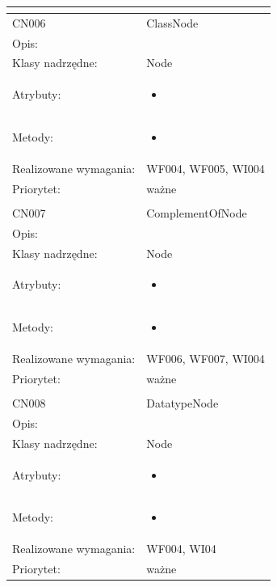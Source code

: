 \documentclass[a4paper,10pt]{article}
\begin{document}
\begin{center}
\begin{longtable}{|m{3cm}|m{9cm}|}
\multicolumn{2}{c}{} \\
 \hline

CN006 & ClassNode \\ \hline
Opis: &     \\ \hline
Klasy nadrzędne: & Node     \\ \hline
Atrybuty: & \begin{itemize}
 \item 
\end{itemize}
 \\ \hline
Metody: & \begin{itemize}
 \item 
\end{itemize}
  \\ \hline
Realizowane wymagania: & WF004, WF005, WI004 \\ \hline
Priorytet: & ważne  \\ \hline

\multicolumn{2}{c}{} \\
 \hline

CN007 & ComplementOfNode \\ \hline
Opis: &     \\ \hline
Klasy nadrzędne: & Node     \\ \hline
Atrybuty: & \begin{itemize}
 \item 
\end{itemize}
 \\ \hline
Metody: & \begin{itemize}
 \item 
\end{itemize}
  \\ \hline
Realizowane wymagania: & WF006, WF007, WI004 \\ \hline
Priorytet: & ważne  \\ \hline

\multicolumn{2}{c}{} \\
 \hline

CN008 & DatatypeNode \\ \hline
Opis: &     \\ \hline
Klasy nadrzędne: & Node     \\ \hline
Atrybuty: & \begin{itemize}
 \item 
\end{itemize}
 \\ \hline
Metody: & \begin{itemize}
 \item 
\end{itemize}
  \\ \hline
Realizowane wymagania: & WF004, WI04 \\ \hline
Priorytet: & ważne  \\ \hline


\end{longtable}
\end{center}
\end{document}
